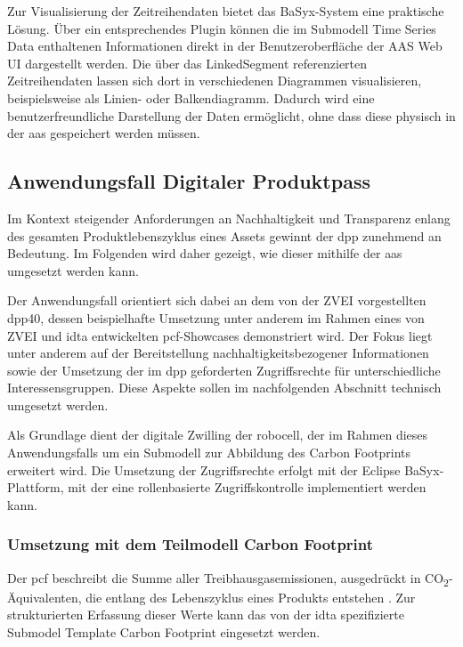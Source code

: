 Zur Visualisierung der Zeitreihendaten bietet das BaSyx-System eine praktische Lösung.
Über ein entsprechendes Plugin können die im Submodell Time Series Data enthaltenen Informationen direkt in der Benutzeroberfläche der AAS Web UI dargestellt werden.
Die über das LinkedSegment referenzierten Zeitreihendaten lassen sich dort in verschiedenen Diagrammen visualisieren, beispielsweise als Linien- oder Balkendiagramm.
Dadurch wird eine benutzerfreundliche Darstellung der Daten ermöglicht, ohne dass diese physisch in der \acs{aas} gespeichert werden müssen.

\newpage
\subsection{Anwendungsfall Digitaler Produktpass}
Im Kontext steigender Anforderungen an Nachhaltigkeit und Transparenz enlang des gesamten Produktlebenszyklus eines Assets gewinnt der \acs{dpp} zunehmend an Bedeutung.
Im Folgenden wird daher gezeigt, wie dieser mithilfe der \acs{aas} umgesetzt werden kann. 

Der Anwendungsfall orientiert sich dabei an dem von der ZVEI vorgestellten \acs{dpp40}, dessen beispielhafte Umsetzung unter anderem im Rahmen eines von ZVEI und \acs{idta} entwickelten \acs{pcf}-Showcases \cite{PCFShowcas} demonstriert wird. 
Der Fokus liegt unter anderem auf der Bereitstellung nachhaltigkeitsbezogener Informationen sowie der Umsetzung der im \acs{dpp} geforderten Zugriffsrechte für unterschiedliche Interessensgruppen.
Diese Aspekte sollen im nachfolgenden Abschnitt technisch umgesetzt werden.

Als Grundlage dient der digitale Zwilling der robocell, der im Rahmen dieses Anwendungsfalls um ein Submodell zur Abbildung des Carbon Footprints erweitert wird.
Die Umsetzung der Zugriffsrechte erfolgt mit der Eclipse BaSyx-Plattform, mit der eine rollenbasierte Zugriffskontrolle implementiert werden kann.

\subsubsection{Umsetzung mit dem Teilmodell Carbon Footprint}
Der \acs{pcf} beschreibt die Summe aller Treibhausgasemissionen, ausgedrückt in CO\textsubscript{2}-Äquivalenten, die entlang des Lebenszyklus eines Produkts entstehen \cite{PCF}. 
Zur strukturierten Erfassung dieser Werte kann das von der \acs{idta} spezifizierte Submodel Template Carbon Footprint \cite{SpezifikaitonPCF} eingesetzt werden.

